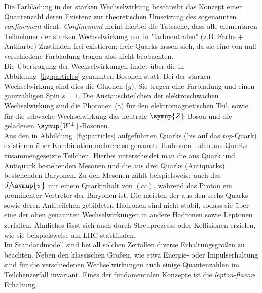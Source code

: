 Die Farbladung in der starken Wechselwirkung beschreibt das Konzept einer Quantenzahl deren Existenz zur theoretischen Umsetzung des sogenannten \textit{confinement} dient. \textit{Confinement} meint hierbei die Tatsache, dass alle elementaren Teilnehmer der starken Wechselwirkung nur in "farbneutralen" (z.B. Farbe + Antifarbe) Zuständen frei existieren; freie Quarks lassen sich, da sie eine von null verschiedene Farbladung tragen also nicht beobachten.\\
%
Die Übertragung der Wechselwirkungen findet über die in Abbildung~\ref{fig:particles} genannten Bosonen statt. Bei der starken Wechselwirkung sind dies die Gluonen ($g$). Sie tragen eine Farbladung und einen ganzzahligen Spin $s=1$. Die Austauschteilchen der elektroschwachen Wechselwirkung sind die Photonen ($\gamma$) für den elektromagnetischen Teil, sowie für die schwache Wechselwirkung das neutrale $\symup{Z}$-Boson und die geladenen $\symup{W^{\pm}}$-Bosonen. \\
%
Aus den in Abbildung~\ref{fig:particles} aufgeführten Quarks (bis auf das \textit{top}-Quark) existieren über Kombination mehrere so genannte Hadronen - also aus Quarks zusammengesetzte Teilchen. Hierbei unterscheidet man die aus Quark und Antiquark bestehenden Mesonen und die aus drei Quarks (Antiquarks) bestehenden Baryonen. Zu den Mesonen zählt beispielsweise auch das $J/\!\symup{\psi}$ mit einem Quarkinhalt von $(c\bar{c})$, während das Proton ein prominenter Vertreter der Baryonen ist. Die meisten der aus den sechs Quarks sowie deren Antiteilchen gebildeten Hadronen sind nicht stabil, sodass sie über eine der oben genannten Wechselwirkungen in andere Hadronen sowie Leptonen zerfallen. Ähnliches lässt sich auch durch Streuprozesse oder Kollisionen erzielen, wie sie beispielsweise am LHC stattfinden.\\
%
Im Standardmodell sind bei all solchen Zerfällen diverse Erhaltungsgrößen zu beachten. Neben den klassischen Größen, wie etwa Energie- oder Impulserhaltung sind für die verschiedenen Wechselwirkungen auch einige Quantenzahlen im Teilchenzerfall invariant. Eines der fundamentalen Konzepte ist die \textit{lepton-flavor}-Erhaltung.
%
